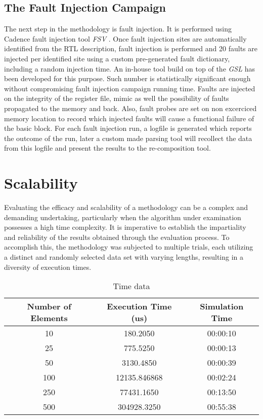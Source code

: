 \documentclass[./dissertation.tex]{subfiles}
\begin{document}
\subsection{The Fault Injection Campaign}
The next step in the methodology is fault injection. It is performed using Cadence fault injection tool {\it FSV} \cite{ICM}. Once fault injection sites are automatically identified from the RTL description, fault injection is performed and 20 faults are injected per identified site using a custom pre-generated fault dictionary, including a random injection time. An in-house tool build on top of the {\it GSL} \cite{GSL} has been developed for this purpose. Such number is statistically significant enough \cite{5090716} without compromising fault injection campaign running time. Faults are injected on the integrity of the register file, mimic as well the possibility of faults propagated to the memory and back. Also, fault probes are set on non excerciced memory location to record which injected faults will cause a functional failure of the basic block. For each fault injection run, a logfile is generated which reports the outcome of the run, later a custom made parsing tool will recollect the data from this logfile and present the results to the re-composition tool.

 


%

\section{Scalability}
Evaluating the efficacy and scalability of a methodology can be a complex and demanding undertaking, particularly when the algorithm under examination possesses a high time complexity. It is imperative to establish the impartiality and reliability of the results obtained through the evaluation process. To accomplish this, the methodology was subjected to multiple trials, each utilizing a distinct and randomly selected data set with varying lengths, resulting in a diversity of execution times.

\begin{table}[H]
\centering
\begin{tabular}{|c|c|c|}
\hline
\textbf{Number of Elements} & \textbf{Execution Time (us)} & \textbf{Simulation Time} \\
\hline
\hline
10 & 180.2050 & 00:00:10 \\
\hline
25 & 775.5250 & 00:00:13 \\
\hline
50 & 3130.4850 & 00:00:39 \\
\hline
100 & 12135.846868 & 00:02:24 \\
\hline
250 & 77431.1650 & 00:13:50 \\
\hline
500 & 304928.3250 & 00:55:38 \\
\hline
\end{tabular}
\caption{Time data}
\label{table:time_data}
\end{table}
\end{document}
